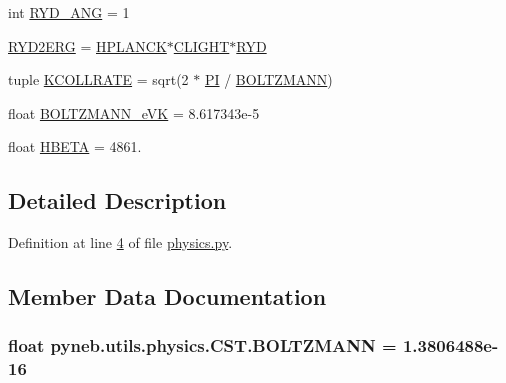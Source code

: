 \begin{DoxyCompactItemize}
\item 
int \hyperlink{classpyneb_1_1utils_1_1physics_1_1_c_s_t_a43417605886b2dc4060af9388d7990bd}{R\-Y\-D\-\_\-\-A\-N\-G} = 1
\item 
\hyperlink{classpyneb_1_1utils_1_1physics_1_1_c_s_t_a3da260eac736f7d74c20f76f79239425}{R\-Y\-D2\-E\-R\-G} = \hyperlink{classpyneb_1_1utils_1_1physics_1_1_c_s_t_a00251eede3f56eadeb766c97f3144c55}{H\-P\-L\-A\-N\-C\-K}$\ast$\hyperlink{classpyneb_1_1utils_1_1physics_1_1_c_s_t_a316a5d8a7c983441bd40589f040f3a09}{C\-L\-I\-G\-H\-T}$\ast$\hyperlink{classpyneb_1_1utils_1_1physics_1_1_c_s_t_a468e4f9fac1fbd71b5ca458a84ae05cc}{R\-Y\-D}
\item 
tuple \hyperlink{classpyneb_1_1utils_1_1physics_1_1_c_s_t_a7f947f81f3596cb129cec85e6ecb78e7}{K\-C\-O\-L\-L\-R\-A\-T\-E} = sqrt(2 $\ast$ \hyperlink{classpyneb_1_1utils_1_1physics_1_1_c_s_t_adeb7151ce462944ff7a0ff2803f873c3}{P\-I} / \hyperlink{classpyneb_1_1utils_1_1physics_1_1_c_s_t_aee0d21a1f9edd72e75c5369bd5bc36b9}{B\-O\-L\-T\-Z\-M\-A\-N\-N})
\item 
float \hyperlink{classpyneb_1_1utils_1_1physics_1_1_c_s_t_aa08a3a7d69c5377fa02f0129aeec8526}{B\-O\-L\-T\-Z\-M\-A\-N\-N\-\_\-e\-V\-K} = 8.\-617343e-\/5
\item 
float \hyperlink{classpyneb_1_1utils_1_1physics_1_1_c_s_t_a969cf775617cba19633611eb7fc1b10b}{H\-B\-E\-T\-A} = 4861.
\end{DoxyCompactItemize}


\subsection{Detailed Description}


Definition at line \hyperlink{physics_8py_source_l00004}{4} of file \hyperlink{physics_8py_source}{physics.\-py}.



\subsection{Member Data Documentation}
\hypertarget{classpyneb_1_1utils_1_1physics_1_1_c_s_t_aee0d21a1f9edd72e75c5369bd5bc36b9}{
\subsubsection[{B\-O\-L\-T\-Z\-M\-A\-N\-N}]{\setlength{\rightskip}{0pt plus 5cm}float pyneb.\-utils.\-physics.\-C\-S\-T.\-B\-O\-L\-T\-Z\-M\-A\-N\-N = 1.\-3806488e-\/16\hspace{0.3cm}{\ttfamily [static]}}}\label{classpyneb_1_1utils_1_1physics_1_1_c_s_t_aee0d21a1f9edd72e75c5369bd5bc36b9}


